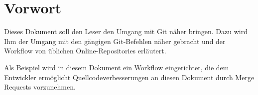 \section*{Vorwort}
Dieses Dokument soll den Leser den Umgang mit Git näher bringen. Dazu wird Ihm der Umgang mit den gängigen Git-Befehlen näher gebracht und der Workflow von üblichen Online-Repositories erläutert. 

Als Beispiel wird in diesem Dokument ein Workflow eingerichtet, die dem Entwickler ermöglicht Quellcodeverbesserungen an diesen Dokument durch Merge Requests vorzunehmen.

\newpage

